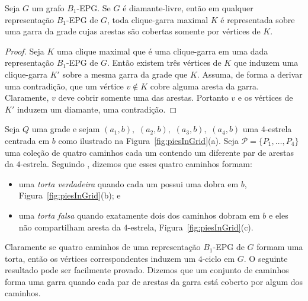 \begin{lema}\label{lem:b1epgDiamondFree}
Seja $G$ um grafo $B_1$-EPG. Se $G$ é diamante-livre, então em qualquer representação $B_1$-EPG de $G$,  toda  clique-garra maximal $K$ é representada sobre uma garra da grade cujas arestas são cobertas somente por  vértices de $K$.
\end{lema}

\begin{proof}Seja $K$ uma  clique maximal que é uma clique-garra em uma dada representação $B_1$-EPG de $G$. Então existem três  vértices de $K$ que induzem uma  clique-garra $K'$ sobre a mesma garra da grade que $K$. Assuma, de forma a derivar uma contradição, que um vértice $v\notin K$ cobre alguma aresta da garra. Claramente, $v$ deve cobrir somente uma das arestas. Portanto $v$ e os vértices de $K'$ induzem um  diamante, uma contradição.
\end{proof}



Seja $ Q $ uma grade e sejam $ (a_1, b),$ $(a_2, b),$ $(a_3, b),$ $(a_4, b)$ uma $4$-estrela centrada em $b$ como ilustrado na Figura~\ref{fig:piesInGrid}(a). Seja $ \mathcal{P} = \{P_1, \dots , P_4\}$ uma coleção de quatro caminhos cada um contendo um diferente par de arestas da $4$-estrela.
Seguindo \cite{golumbic2009}, dizemos que esses quatro caminhos formam:

\begin{itemize}
\item uma \emph{torta verdadeira}  quando cada um possui uma dobra em  $b$, Figura~\ref{fig:piesInGrid}(b); e
\item uma \emph {torta falsa} quando exatamente dois dos caminhos dobram em  $b$ e eles não compartilham aresta da $4$-estrela, Figura~\ref{fig:piesInGrid}(c). %



\end{itemize}

Claramente se quatro caminhos de uma representação $B_1$-EPG de $G$ formam uma torta, então os vértices correspondentes induzem um $4$-ciclo em $G$. %
O seguinte resultado pode ser facilmente provado. Dizemos que um conjunto de caminhos forma uma garra quando cada par de arestas da  garra está coberto por algum dos caminhos.


